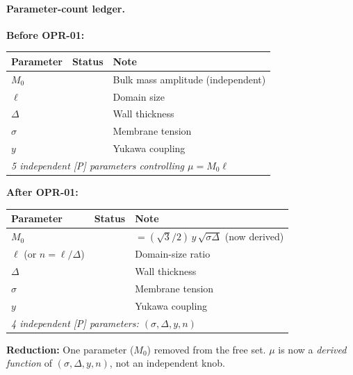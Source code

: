 \paragraph{Parameter-count ledger.}
\begin{tcolorbox}[breakable, enhanced, colback=yellow!5!white, colframe=orange!50!black,
    title=\textbf{Parameter Ledger: Before and After OPR-01}, width=\linewidth]
\label{box:opr21_parameter_ledger}
\textbf{Before OPR-01:}
\begin{center}
\begin{tabular}{lcl}
\toprule
\textbf{Parameter} & \textbf{Status} & \textbf{Note} \\
\midrule
$M_0$ & \tagP{} & Bulk mass amplitude (independent) \\
$\ell$ & \tagP{} & Domain size \\
$\Delta$ & \tagP{} & Wall thickness \\
$\sigma$ & \tagP{} & Membrane tension \\
$y$ & \tagP{} & Yukawa coupling \\
\midrule
\multicolumn{3}{l}{\textit{5 independent [P] parameters controlling $\mu = M_0\ell$}} \\
\bottomrule
\end{tabular}
\end{center}

\textbf{After OPR-01:}
\begin{center}
\begin{tabular}{lcl}
\toprule
\textbf{Parameter} & \textbf{Status} & \textbf{Note} \\
\midrule
$M_0$ & \tagDc{} & $= (\sqrt{3}/2)\, y\, \sqrt{\sigma\Delta}$ (now derived) \\
$\ell$ (or $n = \ell/\Delta$) & \tagP{} & Domain-size ratio \\
$\Delta$ & \tagP{} & Wall thickness \\
$\sigma$ & \tagP{} & Membrane tension \\
$y$ & \tagP{} & Yukawa coupling \\
\midrule
\multicolumn{3}{l}{\textit{4 independent [P] parameters: $(\sigma, \Delta, y, n)$}} \\
\bottomrule
\end{tabular}
\end{center}

\textbf{Reduction:} One parameter ($M_0$) removed from the free set.
$\mu$ is now a \emph{derived function} of $(\sigma, \Delta, y, n)$, not an
independent knob.
\end{tcolorbox}

